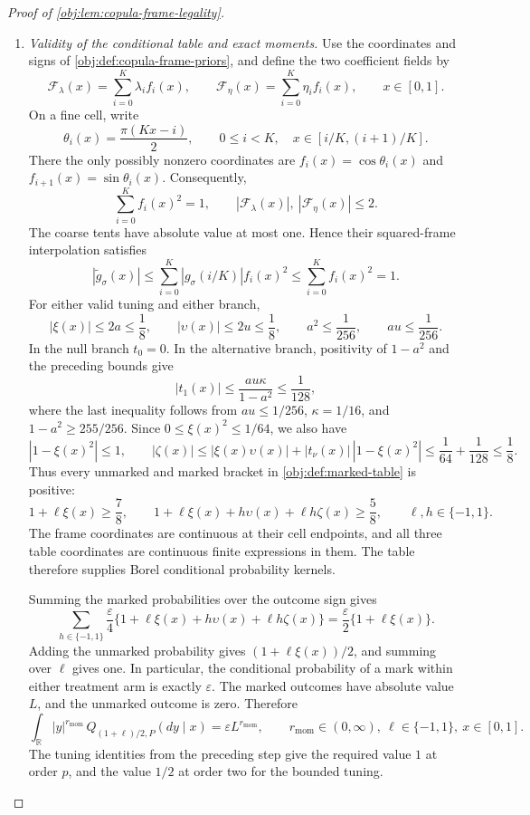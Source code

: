 \documentclass[11pt]{article}
\begin{document}
\begin{proof}[Proof of \cref{obj:lem:copula-frame-legality}]
\begin{enumerate}
\item \textit{Validity of the conditional table and exact moments.}
Use the coordinates and signs of \cref{obj:def:copula-frame-priors}, and define the two coefficient fields by
\[
\mathcal F_\lambda(x)=\sum_{i=0}^{K}\lambda_i f_i(x),
\qquad
\mathcal F_\eta(x)=\sum_{i=0}^{K}\eta_i f_i(x),
\qquad x\in[0,1].
\]
On a fine cell, write
\[
\theta_i(x)=\frac{\pi(Kx-i)}2,
\qquad
0\le i<K,\quad x\in[i/K,(i+1)/K].
\]
There the only possibly nonzero coordinates are
\(f_i(x)=\cos\theta_i(x)\) and
\(f_{i+1}(x)=\sin\theta_i(x)\). Consequently,
\[
\sum_{i=0}^{K}f_i(x)^2=1,\qquad
|\mathcal F_\lambda(x)|,\ |\mathcal F_\eta(x)|\le2.
\]
The coarse tents have absolute value at most one. Hence their squared-frame interpolation satisfies
\[
|\widetilde g_\sigma(x)|
\le\sum_{i=0}^{K}|g_\sigma(i/K)|f_i(x)^2
\le\sum_{i=0}^{K}f_i(x)^2=1.
\]
For either valid tuning and either branch,
\[
|\xi(x)|\le2a\le\frac18,\qquad
|\upsilon(x)|\le2u\le\frac18,
\qquad
a^2\le\frac1{256},\qquad au\le\frac1{256}.
\]
In the null branch \(t_0=0\). In the alternative branch, positivity of \(1-a^2\) and the preceding bounds give
\[
|t_1(x)|
\le\frac{au\kappa}{1-a^2}
\le\frac1{128},
\]
where the last inequality follows from
\(au\le1/256\), \(\kappa=1/16\), and
\(1-a^2\ge255/256\). Since
\(0\le\xi(x)^2\le1/64\), we also have
\[
|1-\xi(x)^2|\le1,
\qquad
|\zeta(x)|
\le|\xi(x)\upsilon(x)|
   +|t_\nu(x)|\,|1-\xi(x)^2|
\le\frac1{64}+\frac1{128}\le\frac18.
\]
Thus every unmarked and marked bracket in
\cref{obj:def:marked-table} is positive:
\[
1+\ell\xi(x)\ge\frac78,
\qquad
1+\ell\xi(x)+h\upsilon(x)+\ell h\zeta(x)
\ge\frac58,
\qquad \ell,h\in\{-1,1\}.
\]
The frame coordinates are continuous at their cell endpoints, and all three table coordinates are continuous finite expressions in them. The table therefore supplies Borel conditional probability kernels.

Summing the marked probabilities over the outcome sign gives
\[
\sum_{h\in\{-1,1\}}
\frac{\varepsilon}{4}
\{1+\ell\xi(x)+h\upsilon(x)+\ell h\zeta(x)\}
=\frac{\varepsilon}{2}\{1+\ell\xi(x)\}.
\]
Adding the unmarked probability gives
\((1+\ell\xi(x))/2\), and summing over \(\ell\) gives one. In particular, the conditional probability of a mark within either treatment arm is exactly \(\varepsilon\). The marked outcomes have absolute value \(L\), and the unmarked outcome is zero. Therefore
\[
\int_{\mathbb R}|y|^{r_{\mathrm{mom}}}
\,Q_{(1+\ell)/2,P}(dy\mid x)
=\varepsilon L^{r_{\mathrm{mom}}},
\qquad
r_{\mathrm{mom}}\in(0,\infty),\
\ell\in\{-1,1\},\ x\in[0,1].
\]
The tuning identities from the preceding step give the required value \(1\) at order \(p\), and the value \(1/2\) at order two for the bounded tuning.


\end{enumerate}
\end{proof}
\end{document}
